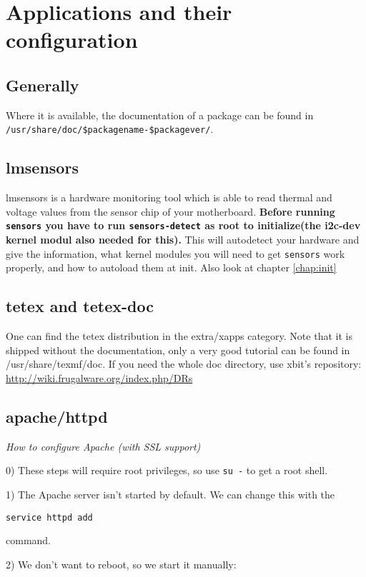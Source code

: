 \chapter{Applications and their configuration}

\section{Generally}
Where it is available, the documentation of a package can be found in {\tt /usr/share/doc/\$packagename-\$packagever/}. 

\section{lmsensors}

lmsensors is a hardware monitoring tool which is able to read thermal and voltage values from the sensor chip of your motherboard.
\textbf{Before running {\tt sensors} you have to run {\tt sensors-detect} as root to initialize(the i2c-dev kernel modul also needed for this).} This will autodetect your hardware and give the information, what kernel modules you will need to get {\tt sensors} work properly, and how to autoload them at init. Also look at chapter \ref{chap:init}

\section{tetex and tetex-doc}

One can find the tetex distribution in the extra/xapps category. Note that it is shipped without the documentation, only a very good tutorial can be found in /usr/share/texmf/doc.
If you need the whole doc directory, use xbit's repository:
\url{http://wiki.frugalware.org/index.php/DRs}

\section{apache/httpd}

\textit{How to configure Apache (with SSL support)}

0) These steps will require root privileges, so use {\tt su -} to get a root shell.

1) The Apache server isn't started by default. We can change this with the

{\tt service httpd add}

command.

2) We don't want to reboot, so we start it manually:

